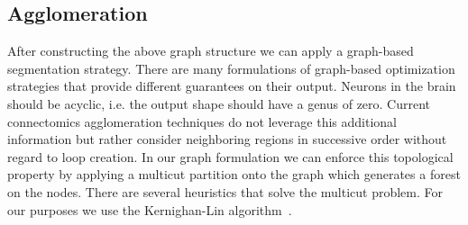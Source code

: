 \subsection{Agglomeration}

After constructing the above graph structure we can apply a graph-based segmentation strategy. 
There are many formulations of graph-based optimization strategies that provide different guarantees on their output. 
Neurons in the brain should be acyclic, i.e. the output shape should have a genus of zero. 
Current connectomics agglomeration techniques do not leverage this additional information but rather consider neighboring regions in successive order without regard to loop creation. 
In our graph formulation we can enforce this topological property by applying a multicut partition onto the graph which generates a forest on the nodes. 
There are several heuristics that solve the multicut problem. For our purposes we use the Kernighan-Lin algorithm~\cite{kernighan1970efficient}.